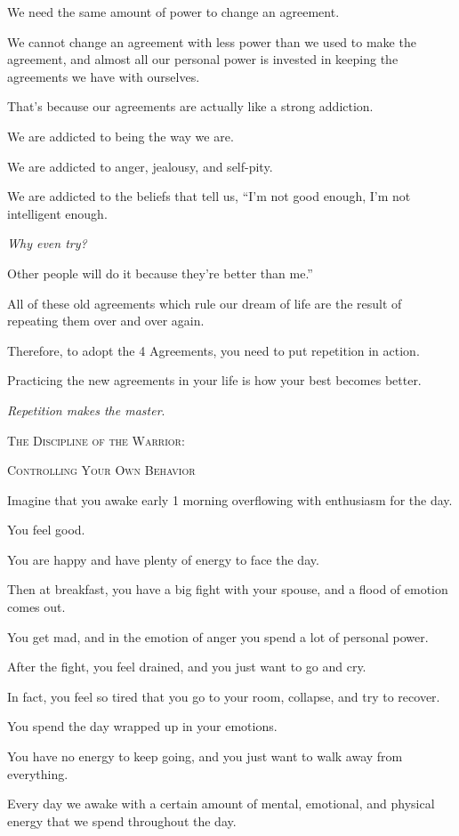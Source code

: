 \documentclass{article}
\numberwithin{equation}{section}
\begin{document}
%
We need the same amount of power to change an agreement.

We cannot change an agreement with less power than we used to make the agreement, and almost all our personal power is invested in keeping the agreements we have with ourselves.

That's because our agreements are actually like a strong addiction.

We are addicted to being the way we are.

We are addicted to anger, jealousy, and self-pity.

We are addicted to the beliefs that tell us, ``I'm not good enough, I'm not intelligent enough.

\textit{Why even try?}

Other people will do it because they're better than me.''

%
All of these old agreements which rule our dream of life are the result of repeating them over and over again.

Therefore, to adopt the 4 Agreements, you need to put repetition in action.

Practicing the new agreements in your life is how your best becomes better.

\textit{Repetition makes the master}.
\begin{center}
    \textsc{The Discipline of the Warrior}:
    
    \textsc{Controlling Your Own Behavior}
\end{center}

Imagine that you awake early 1 morning overflowing with enthusiasm for the day.

You feel good.

You are happy and have plenty of energy to face the day.

Then at breakfast, you have a big fight with your spouse, and a flood of emotion comes out.

You get mad, and in the emotion of anger you spend a lot of personal power.

After the fight, you feel drained, and you just want to go and cry.

In fact, you feel so tired that you go to your room, collapse, and try to recover.

You spend the day wrapped up in your emotions.

You have no energy to keep going, and you just want to walk away from everything.

%
Every day we awake with a certain amount of mental, emotional, and physical energy that we spend throughout the day.
\end{document}
